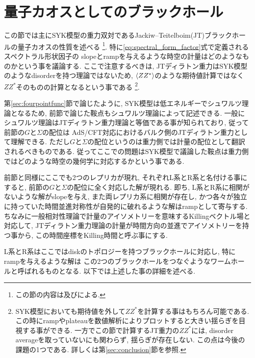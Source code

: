\section{量子カオスとしてのブラックホール\label{sec:gravity}}
この節では主にSYK模型の重力双対であるJackiw--Teitelboim(JT)ブラックホールの量子カオスの性質を述べる
\footnote{この節の内容は\cite{polchinski_chaos}及び\cite{stanford_chaos}による. }. 
特に\eqref{eq:spectral_form_factor}式で定義されるスペクトラル形状因子の
slopeとrampを与えるような時空の計量はどのようなものかという事を議論する. 
ここで注意するべきは, JTディラトン重力はSYK模型のようなdisorderを持つ理論ではないため, 
$\langle ZZ^* \rangle$のような期待値計算ではなく$ZZ^*$そのものの計算となるという事である
\footnote{SYK模型においても期待値を外して$ZZ^*$を計算する事はもちろん可能である. 
この時にrampやplateauを数値解析によりプロットすると大きい揺らぎを目視する事ができる. 
一方でこの節で計算するJT重力の$ZZ^*$には, disorder averageを取っていないにも関わらず, 
揺らぎが存在しない. この点は今後の課題の1つである. 詳しくは第\ref{sec:conclusion}節を参照. }. 

第\ref{sec:fourpointfunc}節で論じたように, SYK模型は低エネルギーでシュワルツ理論となるため, 
前節で論じた鞍点もシュワルツ理論によって記述できる. 
一般にシュワルツ理論はJTディラトン重力理論と等価である事が知られており, 従って前節の$G$と$\Sigma$の配位は
AdS/CFT対応におけるバルク側のJTディラトン重力として理解できる. 
ただし$G$と$\Sigma$の配位というのは重力側では計量の配位として翻訳されるべきものである. 
従ってここでの問題はSYK模型で議論した鞍点は重力側ではどのような時空の幾何学に対応するかという事である. 

前節と同様にここでも2つのレプリカが現れ, それぞれL系とR系と名付ける事にすると, 
前節の$G$と$\Sigma$の配位に全く対応した解が現れる. 
即ち, L系とR系に相関がないような解がslopeを与え, また両レプリカ系に相関が存在し, 
かつ各々が独立に持っていた時間並進対称性が自発的に破れるような解はrampとして寄与する. 
ちなみに一般相対性理論で計量のアイソメトリーを意味するKillingベクトル場と対応して, 
JTディラトン重力理論の計量が時間方向の並進でアイソメトリーを持つ事から, 
この時間座標をKilling時間と呼ぶ事にする. 

L系とR系はここではdiskのトポロジーを持つブラックホールに対応し, 特にrampを与えるような解は
この2つのブラックホールをつなぐようなワームホールと呼ばれるものとなる. 
以下では上述した事の詳細を述べる. 

